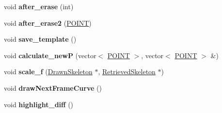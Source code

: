 \begin{DoxyCompactItemize}
\item 
\hypertarget{classScribbleArea_ab3f4452e27b6a1259d6a85400e9a3fcf}{void {\bfseries after\-\_\-erase} (int)}\label{classScribbleArea_ab3f4452e27b6a1259d6a85400e9a3fcf}

\item 
\hypertarget{classScribbleArea_a7e0998c697a5b7bfa75e4824f08742e9}{void {\bfseries after\-\_\-erase2} (\hyperlink{structPOINT}{\-P\-O\-I\-N\-T})}\label{classScribbleArea_a7e0998c697a5b7bfa75e4824f08742e9}

\item 
\hypertarget{classScribbleArea_a05b08c84ce1d699c4b1e9129c36702b2}{void {\bfseries save\-\_\-template} ()}\label{classScribbleArea_a05b08c84ce1d699c4b1e9129c36702b2}

\item 
\hypertarget{classScribbleArea_aeb142252b19c4a70dda699b4ceadf682}{void {\bfseries calculate\-\_\-new\-P} (vector$<$ \hyperlink{structPOINT}{\-P\-O\-I\-N\-T} $>$, vector$<$ \hyperlink{structPOINT}{\-P\-O\-I\-N\-T} $>$ \&)}\label{classScribbleArea_aeb142252b19c4a70dda699b4ceadf682}

\item 
\hypertarget{classScribbleArea_ac1478bfca3dde7dffe85cca86cd7bc95}{void {\bfseries scale\-\_\-f} (\hyperlink{classDrawnSkeleton}{\-Drawn\-Skeleton} $\ast$, \hyperlink{classRetrievedSkeleton}{\-Retrieved\-Skeleton} $\ast$)}\label{classScribbleArea_ac1478bfca3dde7dffe85cca86cd7bc95}

\item 
\hypertarget{classScribbleArea_a0dfb29b85be254318a5f3bf27bd548d2}{void {\bfseries draw\-Next\-Frame\-Curve} ()}\label{classScribbleArea_a0dfb29b85be254318a5f3bf27bd548d2}

\item 
\hypertarget{classScribbleArea_ab527e39e272b010d24a534f62e29c0df}{void {\bfseries highlight\-\_\-diff} ()}\label{classScribbleArea_ab527e39e272b010d24a534f62e29c0df}

\end{DoxyCompactItemize}
